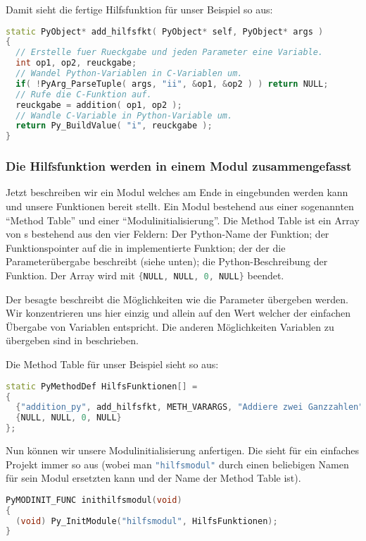 Damit sieht die fertige Hilfsfunktion für unser Beispiel so aus:
\begin{lstlisting}[language=C++, style=CPP]
static PyObject* add_hilfsfkt( PyObject* self, PyObject* args )
{
  // Erstelle fuer Rueckgabe und jeden Parameter eine Variable.
  int op1, op2, reuckgabe;
  // Wandel Python-Variablen in C-Variablen um.
  if( !PyArg_ParseTuple( args, "ii", &op1, &op2 ) ) return NULL;
  // Rufe die C-Funktion auf.
  reuckgabe = addition( op1, op2 );
  // Wandle C-Variable in Python-Variable um.
  return Py_BuildValue( "i", reuckgabe );
}
\end{lstlisting}

\subsubsection{Die Hilfsfunktion werden in einem Modul zusammengefasst}
Jetzt beschreiben wir ein Modul  welches am Ende in \Python eingebunden werden kann und unsere Funktionen bereit stellt.
Ein Modul bestehend aus einer sogenannten ``Method Table'' und einer ``Modulinitialisierung''.
Die Method Table ist ein Array von s bestehend aus den vier Feldern:
Der Python-Name der Funktion;
der Funktionspointer auf die in \C implementierte Funktion;
der  der die Parameterübergabe beschreibt (siehe unten);
die Python-Beschreibung der Funktion.
Der Array wird mit \lstinline[language=C++,style=CPPinline]|{NULL, NULL, 0, NULL}| beendet.

Der besagte  beschreibt die Möglichkeiten wie die Parameter übergeben werden.
Wir konzentrieren uns hier einzig und allein auf den Wert  welcher der einfachen Übergabe von Variablen entspricht.
Die anderen Möglichkeiten Variablen zu übergeben sind in \cite[Extending Python with C or C++; \S 1.4]{Python3} beschrieben.

Die Method Table für unser Beispiel sieht so aus:
\begin{lstlisting}[language=C++, style=CPP]
static PyMethodDef HilfsFunktionen[] =
{
  {"addition_py", add_hilfsfkt, METH_VARARGS, "Addiere zwei Ganzzahlen"},
  {NULL, NULL, 0, NULL}
};
\end{lstlisting}

Nun können wir unsere Modulinitialisierung anfertigen.
Die sieht für ein einfaches Projekt immer so aus (wobei man \lstinline[language=C++,style=CPPinline]|"hilfsmodul"| durch einen beliebigen Namen für sein Modul ersetzten kann und  der Name der Method Table ist).
\begin{lstlisting}[language=C++, style=CPP]
PyMODINIT_FUNC inithilfsmodul(void)
{
  (void) Py_InitModule("hilfsmodul", HilfsFunktionen);
}
\end{lstlisting}

